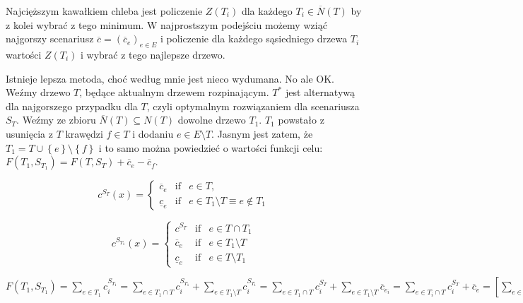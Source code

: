 Najcięższym kawałkiem chleba jest policzenie $Z \left( T_{i} \right)$ dla każdego $T_{i} \in \overline{N} \left( T \right)$ by z kolei wybrać z tego minimum. W najprostszym podejściu możemy wziąć najgorszy scenariusz $\overline{c} = \left( \overline{c}_{e} \right)_{e \in E}$ i policzenie dla każdego sąsiedniego drzewa $T_{i}$ wartości $Z \left( T_{i} \right)$ i wybrać z tego najlepsze drzewo.

Istnieje lepsza metoda, choć według mnie jest nieco wydumana. No ale OK. Weźmy drzewo $T$, będące aktualnym drzewem rozpinającym. $T^{\ast}$ jest alternatywą dla najgorszego przypadku dla $T$, czyli optymalnym rozwiązaniem dla scenariusza $S_{T}$. Weźmy ze zbioru $\overline{N} \left( T \right) \subseteq N \left( T \right)$ dowolne drzewo $T_{1}$. $T_{1}$ powstało z usunięcia z $T$ krawędzi $f \in T$ i dodaniu $e \in E \setminus T$. Jasnym jest zatem, że $T_{1} = T \cup \left\{ e \right\} \setminus \left\{ f \right\}$ i to samo można powiedzieć o wartości funkcji celu: $F \left( T_{1}, S_{T_{1}} \right) = F \left( T, S_{T} \right) + \overline{c}_{e} - \overline{c}_{f}$.

\begin{equation}
c^{S_{T}} \left( x \right) =
\left\{\begin{matrix}
\overline{c}_{e}	&	\textrm{if}	&	e \in T, \\ 
\underline{c}_{e}	&	\textrm{if}	&	e \in T_{1} \setminus T \equiv e \notin T_{1}
\end{matrix}\right.
\end{equation}

\begin{equation}
	c^{S_{T_{1}}} \left( x \right) =
	\left\{\begin{matrix}
	c^{S_{T}}	&	\textrm{if}	&	e \in T \cap T_{1} \\ 
	\overline{c}_{e}	&	\textrm{if}	&	e \in T_{1} \setminus T \\
	\underline{c}_{e}	&	\textrm{if}	&	e \in T \setminus T_{1}
	\end{matrix}\right.
\end{equation}

$F \left( T_{1}, S_{T_{1}} \right) = \sum_{e \in T_{1}} c^{S_{T_{1}}}_{i} = \sum_{e \in T_{1} \cap T} c^{S_{T_{1}}}_{i} + \sum_{e \in T_{1} \setminus T} c^{S_{T_{1}}}_{i} = \sum_{e \in T_{1} \cap T} c^{S_{T}}_{i} + \sum_{e \in T_{1} \setminus T} \overline{c}_{e_{i}} = \sum_{e \in T_{i} \cap T} c^{S_{T}}_{i} + \overline{c}_{e} = \left[ \sum_{e \in T \cap T_{i}} c^{S_{T}}_{i} + \overline{c}_{f} \right] - \overline{c}_{f} + \overline{c}_{e} = \left[ \sum_{e \in T \cap T_{i}} c^{S_{T}}_{i} + \sum_{e \in T \setminus T_{i}} c^{S_{T}}_{i} \right] + \overline{c}_{e} - \overline{c}_{f} = F \left( T, S_{T} \right) + \overline{c}_{e} - \overline{c}_{f}$

